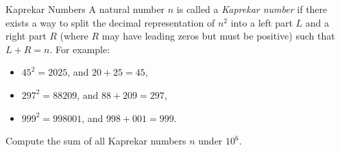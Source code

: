 \begin{problem}{Kaprekar Numbers}
    A natural number \(n\) is called a \textit{Kaprekar number} if there exists a way to split the decimal representation of \(n^2\) into a left part \(L\) and a right part \(R\) (where \(R\) may have leading zeros but must be positive) such that \(L + R = n\). For example:
    \begin{itemize}
      \item \(45^2 = 2025\), and \(20 + 25 = 45\),
      \item \(297^2 = 88209\), and \(88 + 209 = 297\),
      \item \(999^2 = 998001\), and \(998 + 001 = 999\).
    \end{itemize}
    Compute the sum of all Kaprekar numbers \(n\) under \(10^6\).
\end{problem}
